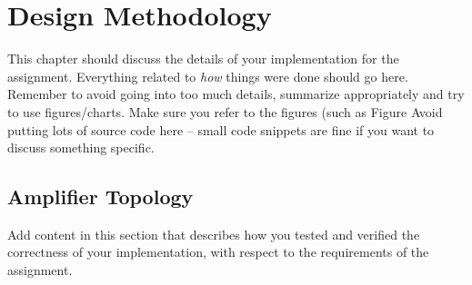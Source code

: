 \chapter{Design Methodology}
This chapter should discuss the details of your implementation for the assignment.
Everything related to \emph{how} things were done should go here.
Remember to avoid going into too much details, summarize appropriately and try to use figures/charts.
Make sure you refer to the figures (such as Figure %
Avoid putting lots of source code here -- small code snippets are fine if you want to discuss something specific.


\section{Amplifier Topology}
Add content in this section that describes how you tested and verified the correctness of your implementation, with respect to the requirements of the assignment.
